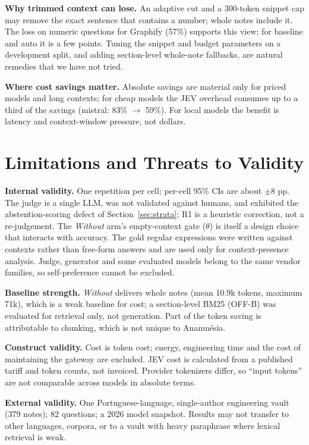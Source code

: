 \documentclass[conference,onecolumn,11pt]{IEEEtran}
\newcommand{\anam}{Anam\-n\'esia}
\begin{document}
\textbf{Why trimmed context can lose.} An adaptive cut and a 300-token snippet cap may remove the exact sentence that contains a number; whole notes include it. The loss on numeric questions for Graphify (57\%) supports this view; for baseline and auto it is a few points. Tuning the snippet and budget parameters on a development split, and adding section-level whole-note fallbacks, are natural remedies that we have not tried.

\textbf{Where cost savings matter.} Absolute savings are material only for priced models and long contexts; for cheap models the JEV overhead consumes up to a third of the savings (mistral: 83\% $\to$ 59\%). For local models the benefit is latency and context-window pressure, not dollars.

\section{Limitations and Threats to Validity}\label{sec:limits}
\textbf{Internal validity.} One repetition per cell; per-cell 95\% CIs are about $\pm8$ pp. The judge is a single LLM, was not validated against humans, and exhibited the abstention-scoring defect of Section~\ref{sec:strata}; R1 is a heuristic correction, not a re-judgement. The \emph{Without} arm's empty-context gate ($\theta$) is itself a design choice that interacts with accuracy. The gold regular expressions were written against contexts rather than free-form answers and are used only for context-presence analysis. Judge, generator and some evaluated models belong to the same vendor families, so self-preference cannot be excluded.

\textbf{Baseline strength.} \emph{Without} delivers whole notes (mean 10.9k tokens, maximum 71k), which is a weak baseline for cost; a section-level BM25 (OFF-B) was evaluated for retrieval only, not generation. Part of the token saving is attributable to chunking, which is not unique to \anam{}.

\textbf{Construct validity.} Cost is token cost; energy, engineering time and the cost of maintaining the gateway are excluded. JEV cost is calculated from a published tariff and token counts, not invoiced. Provider tokenizers differ, so ``input tokens'' are not comparable across models in absolute terms.

\textbf{External validity.} One Portuguese-language, single-author engineering vault (379 notes); 82 questions; a 2026 model snapshot. Results may not transfer to other languages, corpora, or to a vault with heavy paraphrase where lexical retrieval is weak.
\end{document}
